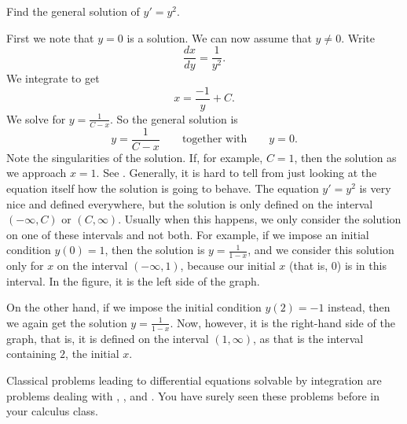 \begin{example}
Find the general solution of
$y' = y^2$.

First we note that $y=0$ is a solution.  We can now assume that $y \neq 0$.
Write
\begin{equation*}
\frac{dx}{dy} = \frac{1}{y^2} .
\end{equation*}
We integrate to get
\begin{equation*}
x = \frac{-1}{y} + C .
\end{equation*}
We solve for $y = \frac{1}{C-x}$.
So the general solution is
\begin{equation*}
y = \frac{1}{C-x} \qquad \text{together with} \qquad y = 0.
\end{equation*}
Note the singularities of the solution.  If, for example, $C=1$, then the
solution  as we approach $x=1$.  See
.  Generally,
it is hard to tell
from just looking at the equation itself how the solution is going to behave.
The equation $y' = y^2$ is very nice and defined everywhere, but
the solution is only defined on the interval $(-\infty, C)$ or
$(C, \infty)$.  Usually when this happens, we only consider the solution
on one of these intervals and not both.
For example, if we impose an initial condition $y(0) = 1$, then
the solution is $y=\frac{1}{1-x}$, and we consider this solution only
for $x$ on the interval $(-\infty,1)$, because our initial $x$ (that is,
$0$) is in this interval.
In the figure, it is the left side of the graph.
\begin{myfig}
\capstart
{}
\caption{Plot of $y=\frac{1}{1-x}$.\label{1over1mx:fig}}
\end{myfig}

On the other hand, if we impose the initial condition $y(2)=-1$ instead, then we again get
the solution $y=\frac{1}{1-x}$.  Now, however, it is the right-hand side of
the graph, that is, it is defined on the interval $(1,\infty)$, as
that is the interval containing $2$, the initial $x$.
\end{example}

Classical problems leading to differential equations solvable by integration
are problems
dealing with ,
, and .  You have surely seen these
problems before in your calculus class.


